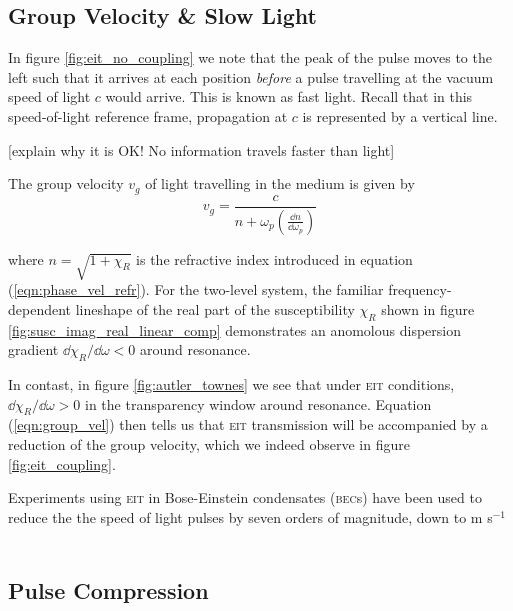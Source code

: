   \subsection{Group Velocity \& Slow Light}

    In figure \ref{fig:eit_no_coupling} we note that the peak of the pulse moves
    to the left such that it arrives at each position \textit{before} a pulse
    travelling at the vacuum speed of light $c$ would arrive. This is known as
    fast light. Recall that in this speed-of-light reference frame, propagation
    at $c$ is represented by a vertical line.

    [explain why it is OK! No information travels faster than light]

    The group velocity $v_g$ of light travelling in the medium is given by\cite{Fleischhauer2005}
    \begin{equation}
        v_g = \frac{c}{n + \omega_p (\frac{\dd n}{\dd \omega_p})}
        \label{eqn:group_vel}
    \end{equation}

    where $n = \sqrt{1 + \chi_R}$ is the refractive index
    introduced in equation (\ref{eqn:phase_vel_refr}). For the two-level system,
    the familiar frequency-dependent lineshape of the real part of the
    susceptibility $\chi_R$ shown in figure
    \ref{fig:susc_imag_real_linear_comp} demonstrates an anomolous dispersion
    gradient $\dd \chi_R / \dd \omega < 0$ around resonance.

    In contast, in figure \ref{fig:autler_townes} we see that under \textsc{eit}
    conditions, $\dd \chi_R / \dd \omega > 0$ in the transparency window around
    resonance. Equation (\ref{eqn:group_vel}) then tells us that \textsc{eit}
    transmission will be accompanied by a reduction of the group velocity, which
    we indeed observe in figure \ref{fig:eit_coupling}.

    Experiments using \textsc{eit} in Bose-Einstein condensates (\textsc{bec}s)
    have been used to reduce the the speed of light pulses by seven orders of
    magnitude, down to \unit[17]{m s$^{-1}$}.\cite{Hau1999}

  \subsection{Pulse Compression}


